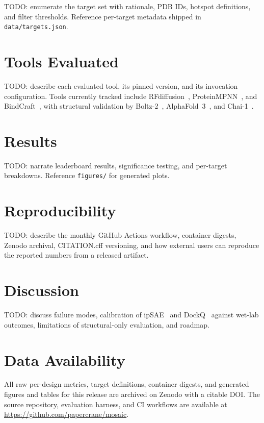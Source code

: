 \documentclass[11pt]{article}
\begin{document}
TODO: enumerate the target set with rationale, PDB IDs, hotspot definitions,
and filter thresholds. Reference per-target metadata shipped in
\texttt{data/targets.json}.

\section{Tools Evaluated}
\label{sec:tools}

TODO: describe each evaluated tool, its pinned version, and its invocation
configuration. Tools currently tracked include
RFdiffusion~\citep{watson2023rfdiffusion},
ProteinMPNN~\citep{dauparas2022proteinmpnn}, and
BindCraft~\citep{pacesa2024bindcraft}, with structural validation by
Boltz-2~\citep{passaro2025boltz2},
AlphaFold~3~\citep{abramson2024alphafold3}, and
Chai-1~\citep{chai2024chai1}.

\section{Results}
\label{sec:results}



TODO: narrate leaderboard results, significance testing, and per-target
breakdowns. Reference \texttt{figures/} for generated plots.

\section{Reproducibility}
\label{sec:reproducibility}

TODO: describe the monthly GitHub Actions workflow, container digests, Zenodo
archival, CITATION.cff versioning, and how external users can reproduce the
reported numbers from a released artifact.

\section{Discussion}
\label{sec:discussion}

TODO: discuss failure modes, calibration of ipSAE~\citep{dunbar2024ipsae} and
DockQ~\citep{basu2016dockq} against wet-lab outcomes, limitations of
structural-only evaluation, and roadmap.

\section{Data Availability}
\label{sec:data}

All raw per-design metrics, target definitions, container digests, and
generated figures and tables for this release are archived on Zenodo with a
citable DOI. The source repository, evaluation harness, and CI workflows are
available at \url{https://github.com/papercrane/mosaic}.



\end{document}
